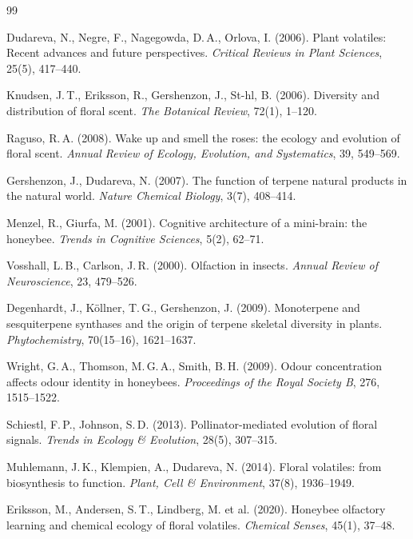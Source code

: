 \documentclass[12pt,a4paper]{article}
\begin{document}
\begin{thebibliography}{99}

 Dudareva, N., Negre, F., Nagegowda, D.\,A., Orlova, I. (2006). Plant volatiles: Recent advances and future perspectives. \textit{Critical Reviews in Plant Sciences}, 25(5), 417--440.

 Knudsen, J.\,T., Eriksson, R., Gershenzon, J., St-hl, B. (2006). Diversity and distribution of floral scent. \textit{The Botanical Review}, 72(1), 1--120.

 Raguso, R.\,A. (2008). Wake up and smell the roses: the ecology and evolution of floral scent. \textit{Annual Review of Ecology, Evolution, and Systematics}, 39, 549--569.

 Gershenzon, J., Dudareva, N. (2007). The function of terpene natural products in the natural world. \textit{Nature Chemical Biology}, 3(7), 408--414.

 Menzel, R., Giurfa, M. (2001). Cognitive architecture of a mini-brain: the honeybee. \textit{Trends in Cognitive Sciences}, 5(2), 62--71.

 Vosshall, L.\,B., Carlson, J.\,R. (2000). Olfaction in insects. \textit{Annual Review of Neuroscience}, 23, 479--526.

 Degenhardt, J., K\"ollner, T.\,G., Gershenzon, J. (2009). Monoterpene and sesquiterpene synthases and the origin of terpene skeletal diversity in plants. \textit{Phytochemistry}, 70(15--16), 1621--1637.

 Wright, G.\,A., Thomson, M.\,G.\,A., Smith, B.\,H. (2009). Odour concentration affects odour identity in honeybees. \textit{Proceedings of the Royal Society B}, 276, 1515--1522.

 Schiestl, F.\,P., Johnson, S.\,D. (2013). Pollinator-mediated evolution of floral signals. \textit{Trends in Ecology \& Evolution}, 28(5), 307--315.

 Muhlemann, J.\,K., Klempien, A., Dudareva, N. (2014). Floral volatiles: from biosynthesis to function. \textit{Plant, Cell \& Environment}, 37(8), 1936--1949.

 Eriksson, M., Andersen, S.\,T., Lindberg, M. et al. (2020). Honeybee olfactory learning and chemical ecology of floral volatiles. \textit{Chemical Senses}, 45(1), 37--48.

\end{thebibliography}
\end{document}
